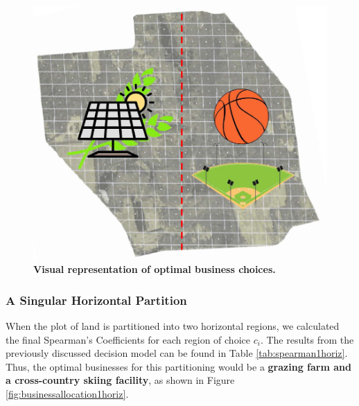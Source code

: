 \documentclass{mcmthesis}
\begin{document}
\begin{figure}[!htbp]
    \centering
    \includegraphics[scale=0.3]{figures/spearman1vert.pdf}
    \caption{\textbf{Visual representation of optimal business choices.}}
    \label{fig:businessallocation1vert}
\end{figure}

\subsubsection{A Singular Horizontal Partition}
When the plot of land is partitioned into two horizontal regions, we calculated the final Spearman's Coefficients for each region of choice $c_i$. The results from the previously discussed decision model can be found in Table \ref{tab:spearman1horiz}. Thus, the optimal businesses for this partitioning would be a \textbf{grazing farm and a cross-country skiing facility}, as shown in Figure \ref{fig:businessallocation1horiz}.
\end{document}
